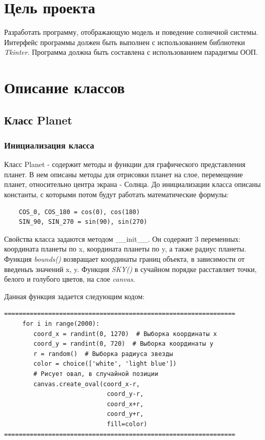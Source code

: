 \documentclass[11pt,a4paper]{report}
\begin{document}
\section{Цель проекта}
Разработать программу, отображающую модель и поведение солнечной системы. Интерфейс программы должен быть выполнен с использованием библиотеки \textit{Tkinter}. Программа должна быть составлена с использованием парадигмы ООП.

\section{Описание классов}


\subsection{Класс Planet}
\subsubsection{Инициализация класса}
Класс Planet  - содержит методы и функции для графического представления планет. В нем описаны методы для отрисовки планет на слое, перемещение планет, относительно центра экрана - Солнца.
До инициализации класса описаны константы, с которыми потом будут работать математические формулы:
\begin{verbatim}
    COS_0, COS_180 = cos(0), cos(180)
    SIN_90, SIN_270 = sin(90), sin(270)
\end{verbatim}
Свойства класса задаются методом \_\_init\_\_. Он содержит 3 переменных: координата планеты по x, координата планеты по y, а также радиус планеты.
Функция \textit{bounds()} возвращает координаты границ объекта, в зависимости от введеныъ значений x, y.
Функция \textit{SKY()} в сучайном порядке расставляет точки, белого и голубого цветов, на слое \textit{canvas}.

Данная функция задается следующим кодом:
\begin{verbatim}
===============================================================
     for i in range(2000):
        coord_x = randint(0, 1270)  # Выборка координаты x
        coord_y = randint(0, 720)  # Выборка координаты y
        r = random()  # Выборка радиуса звезды
        color = choice(['white', 'light blue'])
        # Рисует овал, в случайной позиции
        canvas.create_oval(coord_x-r,
                            coord_y-r, 
                            coord_x+r,
                            coord_y+r,
                            fill=color)  
===============================================================                
\end{verbatim}
\end{document}
